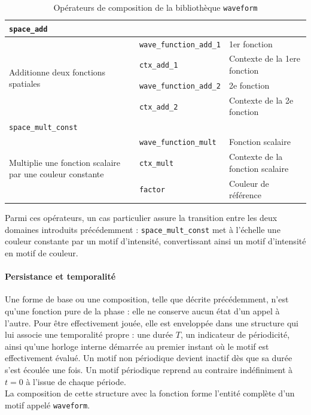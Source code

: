 \begin{table}[H]
\begin{tabular}{p{5.5cm} l p{5.5cm}}
\multicolumn{3}{l}{\texttt{space\_add}} \\
\hline
\multirow{4}{5cm}{Additionne deux fonctions spatiales} &
\texttt{wave\_function\_add\_1} & 1er fonction \\
\cline{2-3}
 & \texttt{ctx\_add\_1} & Contexte de la 1ere fonction \\
\cline{2-3}
 & \texttt{wave\_function\_add\_2} & 2e fonction \\
\cline{2-3}
 & \texttt{ctx\_add\_2} & Contexte de la 2e fonction \\
\hline

\multicolumn{3}{l}{\texttt{space\_mult\_const}} \\
\hline
\multirow{3}{5cm}{Multiplie une fonction scalaire par une couleur constante} &
\texttt{wave\_function\_mult} & Fonction scalaire \\
\cline{2-3}
 & \texttt{ctx\_mult} & Contexte de la fonction scalaire \\
\cline{2-3}
 & \texttt{factor} & Couleur de référence \\
\hline

\end{tabular}
\caption{Opérateurs de composition de la bibliothèque \texttt{waveform}}
\label{tab:operateurs}
\end{table}

Parmi ces opérateurs, un cas particulier assure la transition entre les deux domaines introduits précédemment :
\texttt{space\_mult\_const} met à l'échelle une couleur constante par un motif d'intensité, convertissant ainsi un motif
d'intensité en motif de couleur.

\paragraph*{Persistance et temporalité} Une forme de base ou une composition, telle que décrite précédemment, n'est qu'une
fonction pure de la phase : elle ne conserve aucun état d'un appel à l'autre. Pour être effectivement jouée, elle est
enveloppée dans une structure qui lui associe une temporalité propre : une durée $T$, un indicateur de périodicité, ainsi qu'une
horloge interne démarrée au premier instant où le motif est effectivement évalué. Un motif non périodique devient inactif dès
que sa durée s'est écoulée une fois. Un motif périodique reprend au contraire indéfiniment à $t=0$ à l'issue de chaque période.\\

\noindent La composition de cette structure avec la fonction forme l'entité complète d'un motif appelé \texttt{waveform}.

